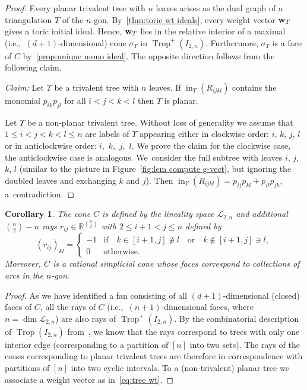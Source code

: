 \documentclass[10pt,a4paper]{amsart}
\newcommand{\thlabel}[1]{\label{#1}}
\newcommand{\thref}[1]{\ref{#1}}
\newtheorem{Corollary}[Theorem]{Corollary}
\numberwithin{equation}{section}
\DeclareMathOperator{\init}{in}
\DeclareMathOperator{\trop}{Trop}
\begin{document}
\begin{proof}
Every planar trivalent tree with $n$ leaves arises as the dual graph of a triangulation $T$ of the $n$-gon.
By~\thref{thm:toric wt ideals}, every weight vector ${\bf w}_T$ gives a toric initial ideal. Hence, ${\bf w}_T$ lies in the relative interior of a maximal (i.e.,~$(d+1)$-dimensional) cone $\sigma_T$ in $\trop^+(I_{2,n})$.
Furthermore, $\sigma_T$ is a face of $C$ by~\thref{prop:unique mono ideal}.
The opposite direction follows from the following claim.

\medskip\noindent
{\it Claim:} Let $\Upsilon$ be a trivalent tree with $n$ leaves. If $\init_{{\Upsilon}}(R_{ijkl})$ contains the monomial $p_{ik}p_{jl}$ for
 all $i<j<k<l $ then $\Upsilon$ is planar.

\medskip

\noindent
Let $\Upsilon$ be a non-planar trivalent tree.
Without loss of generality we assume that $1\le i<j<k<l\le n$ are labels of $\Upsilon$ appearing either in clockwise order: $i$, $k$, $j$, $l$ or in anticlockwise order: $i$,~$k$,~$j$,~$l$.
We prove the claim for the clockwise case, the anticlockwise case is analogous.
We~consider the full subtree with leaves $i$, $j$, $k$, $l$ (similar to the picture in Figure~\ref{fig:lem compute g-vect}, but ignoring the doubled leaves and exchanging $k$ and $j$).
Then $\init_{{\Upsilon}}(R_{ijkl})=p_{ij}p_{kl}+p_{il}p_{jk}$, a~con\-tra\-diction.
\end{proof}


\begin{samepage}
\begin{Corollary}\thlabel{cor:C simplicial}
The cone $C$ is defined by the lineality space $\mathcal L_{2,n}$ and additional $\binom{n}{2}-n$ rays $r_{ij}\in \mathbb R^{\binom{n}{2}}$ with $2\le i+1<j\le n$ defined by
\begin{displaymath}%
(r_{ij})_{kl}=\begin{cases}
-1 & \text{if}\quad k\in [i+1,j]\not\ni l\quad \text{or}\quad k\not\in [i+1,j]\ni l,
\\
0 & \text{otherwise}.
\end{cases}
\end{displaymath}
Moreover, $\overline{C}$ %
is a rational simplicial cone whose faces correspond to collections of arcs in the $n$-gon.
\end{Corollary}
\end{samepage}

\begin{proof}
As we have identified a fan consisting of all $(d+1)$-dimensional (closed) faces of $C$, all the rays of $C$ (i.e.,~$(n+1)$-dimensional faces, where $n=\dim\mathcal L_{2,n}$) are also rays of $\trop^+(I_{2,n})$.
By the combinatorial description of $\trop(I_{2,n})$ %
from~\cite{SS04}, we know that the rays correspond to trees with only one interior edge (corresponding to a partition of $[n]$ into two sets).
The rays of the cones corresponding to planar trivalent trees are therefore in correspondence with partitions of $[n]$ into two cyclic intervals.
To a (non-trivalent) planar tree we associate a weight vector as in~\eqref{eq:tree wt}.
\end{proof}
\end{document}
